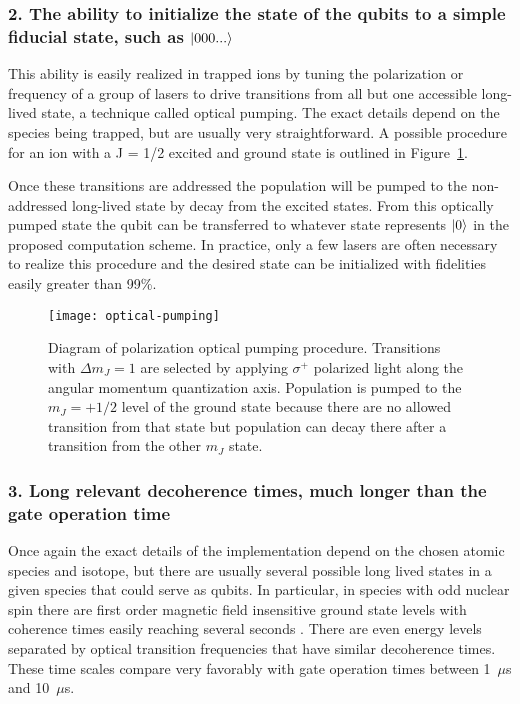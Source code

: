 \subsubsection{2. The ability to initialize the state of the qubits to a simple fiducial state, such as $\left| 000... \right>$} 

This ability is easily realized in trapped ions by tuning the polarization or frequency of a group of lasers to drive transitions from all but one accessible long-lived state, a technique called optical pumping.  The exact details depend on the species being trapped, but are usually very straightforward.  A possible procedure for an ion with a J = 1/2 excited and ground state is outlined in Figure~\ref{fig:optical-pumping}.  

Once these transitions are addressed the population will be pumped to the non-addressed long-lived state by decay from the excited states.  From this optically pumped state the qubit can be transferred to whatever state represents $\left| 0 \right>$ in the proposed computation scheme.  In practice, only a few lasers are often necessary to realize this procedure and the desired state can be initialized with fidelities easily greater than 99\%.

\begin{figure}
	\centering
	\texttt{[image: optical-pumping]}
	\caption[Diagram of optical pumping procedure]{Diagram of polarization optical pumping procedure.  Transitions with $\Delta m_J = 1$ are selected by applying $\sigma^+$ polarized light along the angular momentum quantization axis.  Population is pumped to the $m_J = +1/2$ level of the ground state because there are no allowed transition from that state but population can decay there after a transition from the other $m_J$ state.}
	\label{fig:optical-pumping}
\end{figure}

\subsubsection{3. Long relevant decoherence times, much longer than the gate operation time}

Once again the exact details of the implementation depend on the chosen atomic species and isotope, but there are usually several possible long lived states in a given species that could serve as qubits.  In particular, in species with odd nuclear spin there are first order magnetic field insensitive ground state levels with coherence times easily reaching several seconds \cite{Olmschenk:07,Mount:13}.  There are even energy levels separated by optical transition frequencies that have similar decoherence times.  These time scales compare very favorably with gate operation times between 1~$\mu$s and 10~$\mu$s.

